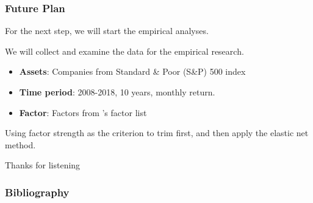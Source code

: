 \documentclass[12pt]{beamer}
\begin{document}
\begin{frame}
\frametitle{Future Plan}
For the next step, we will start the empirical analyses. 

We will collect and examine the data for the empirical research. 
\begin{itemize}
\item {\bf Assets}:  Companies from Standard \& Poor (S\&P) 500 index\\
\item {\bf Time period}: 2008-2018, 10 years, monthly return. \\
\item {\bf Factor}:  Factors from 's factor list\\
\end{itemize}
Using factor strength as the criterion to trim first, and then apply the elastic net method.
\end{frame}
\begin{frame}
	\centering	
\huge{ Thanks for listening\\}
\end{frame}


\begin{frame}[allowframebreaks]
	\frametitle{Bibliography}
	
{\footnotesize}
\end{frame}
\end{document}
